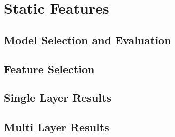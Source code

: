 
\chapter{Static Features}
\label{chapter:static_features}

\section{Model Selection and Evaluation}
\label{section:model_selection}

\section{Feature Selection}
\label{section:feature_selection}

\section{Single Layer Results}
\label{section:single_layer_results}

\section{Multi Layer Results}
\label{section:multi_layer_results}